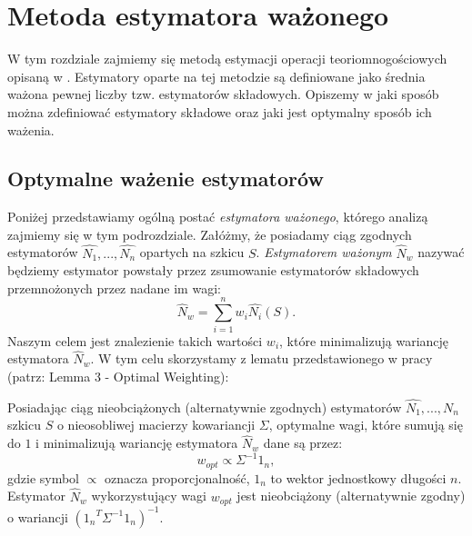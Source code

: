 \chapter{Metoda estymatora ważonego}
\label{weighted_method}
\thispagestyle{chapterBeginStyle}




W tym rozdziale zajmiemy się metodą estymacji operacji teoriomnogościowych opisaną w \cite{ting}. Estymatory oparte na tej metodzie są definiowane jako średnia ważona pewnej liczby  tzw. estymatorów składowych. Opiszemy w jaki sposób można zdefiniować estymatory składowe oraz jaki jest optymalny sposób ich ważenia. 

\section{Optymalne ważenie estymatorów}


Poniżej przedstawiamy ogólną postać \textit{estymatora ważonego}, którego analizą zajmiemy się w tym podrozdziale. Załóżmy, że posiadamy ciąg zgodnych estymatorów $\hat{N_1}, ..., \hat{N_n}$ opartych na szkicu $S$. \textit{Estymatorem ważonym} $\hat{N}_w$ nazywać będziemy estymator powstały przez zsumowanie estymatorów składowych przemnożonych przez nadane im wagi:
\begin{equation}
\label{weighted_est_general}
\hat{N}_w = \sum_{i=1}^{n}w_i\hat{N_i}(S).
\end{equation}
Naszym celem jest znalezienie takich wartości $w_i$, które minimalizują wariancję estymatora $\hat{N}_w$. W tym celu skorzystamy z lematu przedstawionego w pracy \cite{ting} (patrz: Lemma 3 - Optimal Weighting):
\begin{lemma}
	 Posiadając ciąg nieobciążonych (alternatywnie zgodnych) estymatorów $\hat{N_1}, ..., \hat{N_n}$ szkicu $S$ o nieosobliwej macierzy kowariancji $\Sigma$, optymalne wagi, które sumują się do $1$ i minimalizują wariancję estymatora $\hat{N}_w$ dane są przez:
	 \begin{equation}
	 	w_{opt} \propto  \Sigma^{-1}1_n,
	 \end{equation}
	 gdzie  symbol $\propto$ oznacza proporcjonalność, $1_n$ to wektor jednostkowy długości $n$. Estymator $\hat{N}_w$ wykorzystujący wagi $w_{opt}$ jest nieobciążony (alternatywnie zgodny)
	 o wariancji $({{1_n}^{T}\Sigma^{-1}1_n})^{-1}$. %
\end{lemma}


